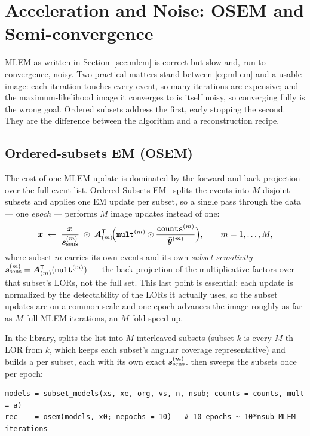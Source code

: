 \section{Acceleration and Noise: OSEM and Semi-convergence}
\label{sec:acceleration}

MLEM as written in Section~\ref{sec:mlem} is correct but slow and, run to
convergence, noisy. Two practical matters stand between \eqref{eq:ml-em} and a
usable image: each iteration touches every event, so many iterations are
expensive; and the maximum-likelihood image it converges to is itself noisy, so
converging fully is the wrong goal. Ordered subsets address the first,
early stopping the second. They are the difference between the algorithm and a
reconstruction recipe.

\subsection{Ordered-subsets EM (OSEM)}
\label{sec:acceleration:osem}

The cost of one MLEM update is dominated by the forward and back-projection over
the full event list. Ordered-Subsets EM~\cite{hudson1994} splits the events into
$M$ disjoint subsets and applies one EM update per subset, so a single pass
through the data --- one \emph{epoch} --- performs $M$ image updates instead of
one:
\begin{equation}
  \bm{x} \;\leftarrow\; \frac{\bm{x}}{\bm{s}_{\mathrm{sens}}^{(m)}}\;\odot\;
       \bm{A}^{\mathsf{T}}_{(m)}\!\Bigl(\texttt{mult}^{(m)}\odot
       \frac{\texttt{counts}^{(m)}}{\bar{\bm{y}}^{(m)}}\Bigr),
  \qquad m = 1,\dots,M,
  \label{eq:acc-osem}
\end{equation}
where subset $m$ carries its own events and its own \emph{subset sensitivity}
$\bm{s}_{\mathrm{sens}}^{(m)}=\bm{A}^{\mathsf{T}}_{(m)}(\texttt{mult}^{(m)})$ --- the back-projection of the
multiplicative factors over that subset's LORs, not the full set. This last point
is essential: each update is normalized by the detectability of the LORs it
actually uses, so the subset updates are on a common scale and one epoch advances
the image roughly as far as $M$ full MLEM iterations, an $M$-fold speed-up.

In the library,  splits the list into $M$ interleaved
subsets (subset $k$ is every $M$-th LOR from $k$, which keeps each subset's
angular coverage representative) and builds a  per
subset, each with its own exact $\bm{s}_{\mathrm{sens}}^{(m)}$.  then sweeps the
subsets once per epoch:
\begin{lstlisting}
models = subset_models(xs, xe, org, vs, n, nsub; counts = counts, mult = a)
rec    = osem(models, x0; nepochs = 10)   # 10 epochs ~ 10*nsub MLEM iterations
\end{lstlisting}

